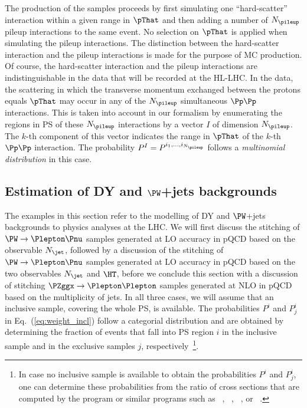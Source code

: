 The production of the samples proceeds by first simulating one ``hard-scatter'' interaction within a given range in $\pThat$
and then adding a number of $N_{\pileup}$ pileup interactions to the same event.
No selection on $\pThat$ is applied when simulating the pileup interactions.
The distinction between the hard-scatter interaction and the pileup interactions is made for the purpose of MC production.
Of course, the hard-scatter interaction and the pileup interactions are indistinguishable in the data that will be recorded at the HL-LHC.
In the data, the scattering in which the transverse momentum exchanged between the protons equals $\pThat$ may occur in any of the $N_{\pileup}$ simultaneous $\Pp\Pp$ interactions.
This is taken into account in our formalism by enumerating the regions in PS of these $N_{\pileup}$ interactions by a vector $I$ of dimension $N_{\pileup}$.
The $k$-th component of this vector indicates the range in $\pThat$ of the $k$-th $\Pp\Pp$ interaction.
The probability $P^{I} = P^{i_{1},\dots,i_{N_{\pileup}}}$ follows a {\em multinomial distribution} in this case.


\subsection{Estimation of DY and \texorpdfstring{$\PW$}{W}+jets backgrounds}
\label{sec:examples_background_yield}

The examples in this section refer to the modelling of DY and $\PW$+jets backgrounds to physics analyses at the LHC.
We will first discuss the stitching of $\PW \to \Plepton\Pnu$ samples generated at LO accuracy in pQCD based on the observable $N_{\jet}$, 
followed by a discussion of the stitching of $\PW \to \Plepton\Pnu$ samples generated at LO accuracy in pQCD based on the two observables $N_{\jet}$ and $\HT$,
before we conclude this section with a discussion of stitching $\PZggx \to \Plepton\Plepton$ samples generated at NLO in pQCD based on the multiplicity of jets.
In all three cases, we will assume that an inclusive sample, covering the whole PS, is available.
The probabilities $P^{i}$ and $P_{j}^{i}$ in Eq.~(\ref{eq:weight_incl})
follow a categorial distribution and
are obtained by determining the fraction of events that fall into PS region $i$ in the inclusive sample and in the exclusive samples $j$, respectively~\footnote{
  In case no inclusive sample is available to obtain the probabilities $P^{i}$ and $P_{j}^{i}$,
  one can determine these probabilities from the ratio of cross sections that are computed by the program \MGvATNLO 
  or similar programs such as \POWHEG~\cite{Nason:2004rx,Frixione:2007vw,Alioli:2010xd}, \SHERPA~\cite{Gleisberg:2008ta}, \ALPGEN~\cite{Mangano:2002ea}, or \MCFM~\cite{Campbell:2011bn}.}.

